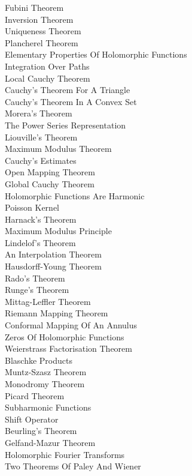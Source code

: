 Fubini Theorem \\
Inversion Theorem \\
Uniqueness Theorem \\
Plancherel Theorem \\
Elementary Properties Of Holomorphic Functions \\
Integration Over Paths \\
Local Cauchy Theorem \\
Cauchy's Theorem For A Triangle \\
Cauchy's Theorem In A Convex Set \\
Morera's Theorem \\
The Power Series Representation \\
Liouville's Theorem \\
Maximum Modulus Theorem \\
Cauchy's Estimates \\
Open Mapping Theorem \\
Global Cauchy Theorem \\
Holomorphic Functions Are Harmonic \\
Poisson Kernel \\
Harnack's Theorem \\
Maximum Modulus Principle \\
Lindelof's Theorem \\
An Interpolation Theorem \\
Hausdorff-Young Theorem \\
Rado's Theorem \\
Runge's Theorem \\
Mittag-Leffler Theorem \\
Riemann Mapping Theorem \\
Conformal Mapping Of An Annulus \\
Zeros Of Holomorphic Functions \\
Weierstrass Factorisation Theorem \\
Blaschke Products \\
Muntz-Szasz Theorem \\
Monodromy Theorem \\
Picard Theorem \\
Subharmonic Functions \\
Shift Operator \\
Beurling's Theorem \\
Gelfand-Mazur Theorem \\
Holomorphic Fourier Transforms \\
Two Theorems Of Paley And Wiener \\
